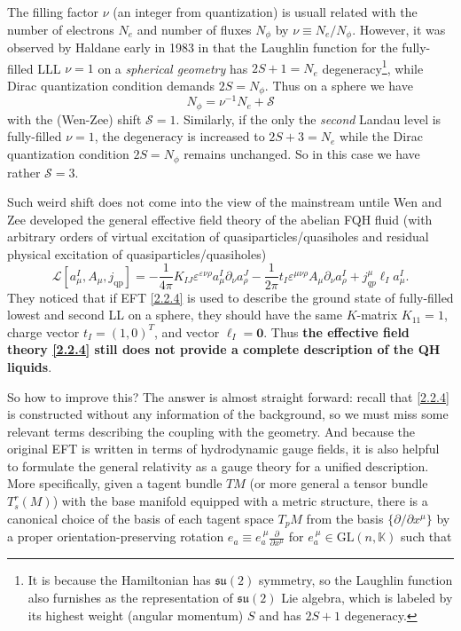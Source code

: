 \documentclass[10pt,nofootinbib,letterpaper]{revtex4}
\begin{document}
		\indent The filling factor $\nu$  (an integer from quantization) is usuall related with the number of electrons $N_e$ and number of fluxes $N_\phi$ by $\nu\equiv N_e/N_\phi$. However, it was observed by Haldane early in 1983 in \cite{haldane1983fractional} that the Laughlin function for the fully-filled LLL $\nu=1$ on a \emph{spherical geometry} has $2S+1=N_e$ degeneracy\footnote{It is because the Hamiltonian has $\mathfrak{su}(2)$ symmetry, so the Laughlin function also furnishes as the representation of $\mathfrak{su}(2)$ Lie algebra, which is labeled by its highest weight (angular momentum) $S$ and has $2S+1$ degeneracy.}, while Dirac quantization condition demands $2S=N_\phi$. Thus on a sphere we have
		\begin{equation}\label{2.2.3}
			N_\phi=\nu^{-1}N_e+\mathcal{S}
		\end{equation}
		with the (Wen-Zee) shift $\mathcal{S}=1$. Similarly, if the only the \emph{second} Landau level is fully-filled $\nu=1$, the degeneracy is increased to $2S+3=N_e$ while the Dirac quantization condition $2S=N_\phi$ remains unchanged. So in this case we have rather $\mathcal{S}=3$.\par
		Such weird shift does not come into the view of the mainstream untile Wen and Zee developed the general effective field theory of the abelian FQH fluid \cite{wen1992classification} (with arbitrary orders of virtual excitation of quasiparticles/quasiholes and residual physical excitation of quasiparticles/quasiholes)
		\begin{equation}\label{2.2.4}
			\mathcal{L}[a_\mu^I,A_\mu,j_{\text{qp}}]=-\dfrac{1}{4\pi}K_{IJ}\varepsilon^{\varepsilon\nu\rho}a_\mu^I \partial_\nu a_\rho^J-\dfrac{1}{2\pi}t_I \varepsilon^{\mu\nu\rho}A_\mu \partial_\nu a_\rho^I+j_{qp}^\mu\ell_I a_\mu^I.
		\end{equation}
		They noticed that if EFT \eqref{2.2.4} is used to describe the ground state of fully-filled lowest and second LL on a sphere, they should have the same $K$-matrix $K_{11}=1$, charge vector $t_I=(1,0)^T$, and vector $\ell_I=\mathbf{0}$. Thus \textbf{the effective field theory \eqref{2.2.4} still does not provide a complete description of the QH liquids}.\par
		So how to improve this? The answer is almost straight forward: recall that \eqref{2.2.4} is constructed without any information of the background, so we must miss some relevant terms describing the coupling with the geometry. And because the original EFT is written in terms of hydrodynamic gauge fields, it is also helpful to formulate the general relativity as a gauge theory for a unified description. More specifically, given a tagent bundle $TM$ (or more general a tensor bundle $T^r_s(M)$) with the base manifold equipped with a metric structure, there is a canonical choice of the basis of each tagent space $T_pM$ from the basis $\{\partial/\partial x^\mu\}$ by a proper orientation-preserving rotation $e_a\equiv e_a^{~\mu}\frac{\partial }{\partial x^\mu}$ for $e_a^{~\mu}\in\mathrm{GL}(n,\mathbb{K})$ such that
\end{document}
